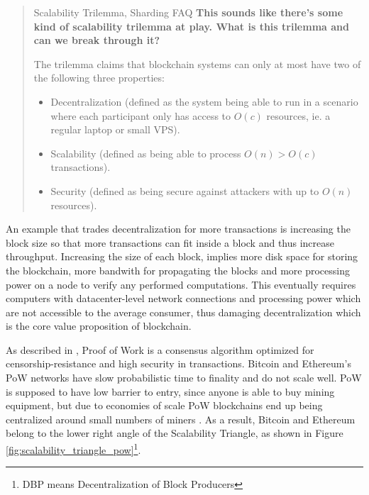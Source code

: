 \begin{quote}{Scalability Trilemma, Sharding FAQ}
    \textbf{This sounds like there’s some kind of scalability trilemma at play. What is this trilemma and can we break through it?}

    The trilemma claims that blockchain systems can only at most have two of the following three properties:

    \begin{itemize}
        \item Decentralization (defined as the system being able to run in a scenario where each participant only has access to $O(c)$ resources, ie. a regular laptop or small VPS).
        \item Scalability (defined as being able to process $O(n) > O(c)$ transactions).
        \item Security (defined as being secure against attackers with up to $O(n)$ resources).
    \end{itemize}
\end{quote}

An example that trades decentralization for more transactions is increasing the block size so that more transactions can fit inside a block and thus increase throughput. Increasing the size of each block, implies more disk space for storing the blockchain, more bandwith for propagating the blocks and more processing power on a node to verify any performed computations. This eventually requires computers with datacenter-level network connections and processing power which are not accessible to the average consumer, thus damaging decentralization which is the core value proposition of blockchain. %

As described in \cite{scaling-trustless-models}, Proof of Work is a consensus algorithm optimized for censorship-resistance and high security in transactions.  Bitcoin and Ethereum's PoW networks have slow probabilistic time to finality and do not scale well. PoW is supposed to have low barrier to entry, since anyone is able to buy mining equipment, but due to economies of scale PoW blockchains end up being centralized around small numbers of miners \cite{Gencer2018DecentralizationIB}. As a result, Bitcoin and Ethereum belong to the lower right angle of the Scalability Triangle, as shown in Figure \ref{fig:scalability_triangle_pow}\footnote{DBP means Decentralization of Block Producers}. 

